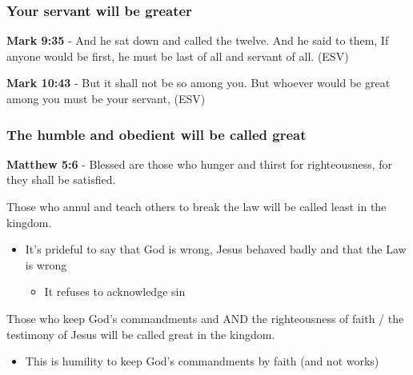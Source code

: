 \documentclass[11pt]{article}
\begin{document}
\subsubsection{Your servant will be greater}
\label{sec:org1b38d98}

\textbf{Mark 9:35} - And he sat down and called the twelve. And he said to them, If anyone would be first, he must be last of all and servant of all. (ESV)

\textbf{Mark 10:43} - But it shall not be so among you. But whoever would be great among you must be your servant, (ESV)

\subsubsection{The humble and obedient will be called great}
\label{sec:org1aea1a3}
\textbf{Matthew 5:6} - Blessed are those who hunger and thirst for righteousness, for they shall be satisfied.

Those who annul and teach others to break the law will be called least in the kingdom.
\begin{itemize}
\item It's prideful to say that God is wrong, Jesus behaved badly and that the Law is wrong
\begin{itemize}
\item It refuses to acknowledge sin
\end{itemize}
\end{itemize}
Those who keep God's commandments and AND the righteousness of faith / the testimony of Jesus will be called great in the kingdom.
\begin{itemize}
\item This is humility to keep God's commandments by faith (and not works)
\end{itemize}
\end{document}
